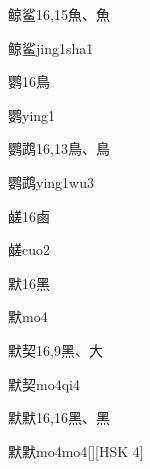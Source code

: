 \begin{Entry}{鲸鲨}{16,15}{⿂、⿂}
  \begin{Phonetics}{鲸鲨}{jing1sha1}
  \end{Phonetics}
\end{Entry}

\begin{Entry}{鹦}{16}{⿃}
  \begin{Phonetics}{鹦}{ying1}
  \end{Phonetics}
\end{Entry}

\begin{Entry}{鹦鹉}{16,13}{⿃、⿃}
  \begin{Phonetics}{鹦鹉}{ying1wu3}
  \end{Phonetics}
\end{Entry}

\begin{Entry}{鹾}{16}{⿄}
  \begin{Phonetics}{鹾}{cuo2}
  \end{Phonetics}
\end{Entry}

\begin{Entry}{默}{16}{⿊}
  \begin{Phonetics}{默}{mo4}
  \end{Phonetics}
\end{Entry}

\begin{Entry}{默契}{16,9}{⿊、⼤}
  \begin{Phonetics}{默契}{mo4qi4}
  \end{Phonetics}
\end{Entry}

\begin{Entry}{默默}{16,16}{⿊、⿊}
  \begin{Phonetics}{默默}{mo4mo4}[][HSK 4]
  \end{Phonetics}
\end{Entry}


